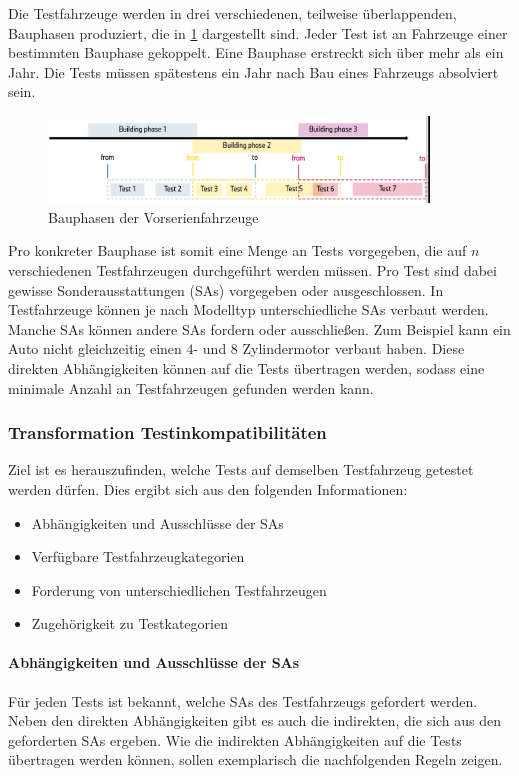 Die Testfahrzeuge werden in drei verschiedenen, teilweise überlappenden,
Bauphasen produziert, die in \cref{fig:test_times} dargestellt sind.
Jeder Test ist an Fahrzeuge einer bestimmten Bauphase gekoppelt.
Eine Bauphase erstreckt sich über mehr als ein Jahr.
Die Tests müssen spätestens ein Jahr nach Bau eines
Fahrzeugs absolviert sein.
\begin{figure}[H]
    \centering
    \includegraphics[width=0.9\textwidth]{images/testfahrzeug_problem/test_times}
    \caption{Bauphasen der Vorserienfahrzeuge}
    \label{fig:test_times}
\end{figure}

Pro konkreter Bauphase ist somit eine Menge an Tests vorgegeben,
die auf $n$ verschiedenen Testfahrzeugen durchgeführt werden müssen.
Pro Test sind dabei gewisse Sonderausstattungen (SAs) vorgegeben oder ausgeschlossen.
In Testfahrzeuge können je nach Modelltyp unterschiedliche SAs
verbaut werden. Manche SAs können andere SAs fordern oder ausschließen.
Zum Beispiel kann ein Auto nicht gleichzeitig einen $4$- und $8$
Zylindermotor verbaut haben. Diese direkten Abhängigkeiten können auf die Tests
übertragen werden, sodass eine minimale Anzahl an Testfahrzeugen gefunden werden kann.

\subsubsection{Transformation Testinkompatibilitäten}

Ziel ist es herauszufinden, welche Tests auf demselben Testfahrzeug getestet
werden dürfen. Dies ergibt sich aus den folgenden Informationen:

\begin{itemize}
    \item Abhängigkeiten und Ausschlüsse der SAs
    \item Verfügbare Testfahrzeugkategorien
    \item Forderung von unterschiedlichen Testfahrzeugen
    \item Zugehörigkeit zu Testkategorien
\end{itemize}

\paragraph{Abhängigkeiten und Ausschlüsse der SAs}
Für jeden Tests ist bekannt, welche SAs des Testfahrzeugs gefordert werden.
Neben den direkten Abhängigkeiten gibt es auch die indirekten, die sich aus den
geforderten SAs ergeben. Wie die indirekten Abhängigkeiten auf die Tests übertragen
werden können, sollen exemplarisch die nachfolgenden Regeln zeigen.

